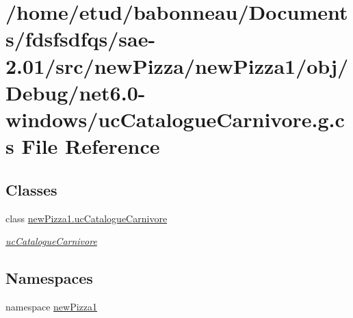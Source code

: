 \hypertarget{Debug_2net6_80-windows_2ucCatalogueCarnivore_8g_8cs}{}\section{/home/etud/babonneau/\+Documents/fdsfsdfqs/sae-\/2.01/src/new\+Pizza/new\+Pizza1/obj/\+Debug/net6.0-\/windows/uc\+Catalogue\+Carnivore.g.\+cs File Reference}
\label{Debug_2net6_80-windows_2ucCatalogueCarnivore_8g_8cs}
\subsection*{Classes}
\begin{DoxyCompactItemize}
\item 
class \hyperlink{classnewPizza1_1_1ucCatalogueCarnivore}{new\+Pizza1.\+uc\+Catalogue\+Carnivore}
\begin{DoxyCompactList}\small\item\em \hyperlink{classnewPizza1_1_1ucCatalogueCarnivore}{uc\+Catalogue\+Carnivore} \end{DoxyCompactList}\end{DoxyCompactItemize}
\subsection*{Namespaces}
\begin{DoxyCompactItemize}
\item 
namespace \hyperlink{namespacenewPizza1}{new\+Pizza1}
\end{DoxyCompactItemize}
